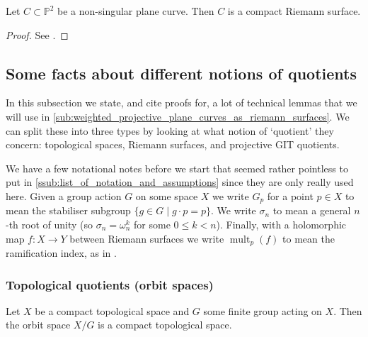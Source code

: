 \documentclass[10pt,notitlepage]{article}
\numberwithin{equation}{subsection}
\DeclareMathOperator{\mult}{mult}
\newcommand{\pee}{\mathbb{P}}
\begin{document}
    \begin{lemma}\label{lem:str-proj-plane-curve-rs}
        Let $C\subset\pee^2$ be a non-singular plane curve.
        Then $C$ is a compact Riemann surface.
    \end{lemma}

    \begin{proof}
        See \cite[Chapter~I,~Proposition~3.6]{Miranda:1995uz}.
    \end{proof}



    \subsection{Some facts about different notions of quotients} %
    \label{sub:some_facts_that_we_need}


        In this subsection we state, and cite proofs for, a lot of technical lemmas that we will use in \cref{sub:weighted_projective_plane_curves_as_riemann_surfaces}.
        We can split these into three types by looking at what notion of `quotient' they concern: topological spaces, Riemann surfaces, and projective GIT quotients.

        We have a few notational notes before we start that seemed rather pointless to put in \cref{ssub:list_of_notation_and_assumptions} since they are only really used here.
        Given a group action $G$ on some space $X$ we write $G_p$ for a point $p\in X$ to mean the stabiliser subgroup $\{g\in G\mid g\cdot p = p\}$.
        We write $\sigma_n$ to mean a general $n$-th root of unity (so $\sigma_n=\omega_n^k$ for some $0\leqslant k<n$).
        Finally, with a holomorphic map $f\colon X\to Y$ between Riemann surfaces we write $\mult_p(f)$ to mean the ramification index, as in \cite[Chapter~II,~Definition~4.2]{Miranda:1995uz}.



        \subsubsection{Topological quotients (orbit spaces)} %
        \label{ssub:topological_quotients_}

            \begin{lemma}\label{lem:comp-conn-quot}
                Let $X$ be a compact topological space and $G$ some finite group acting on $X$.
                Then the orbit space $X/G$ is a compact topological space.
            \end{lemma}
\end{document}
